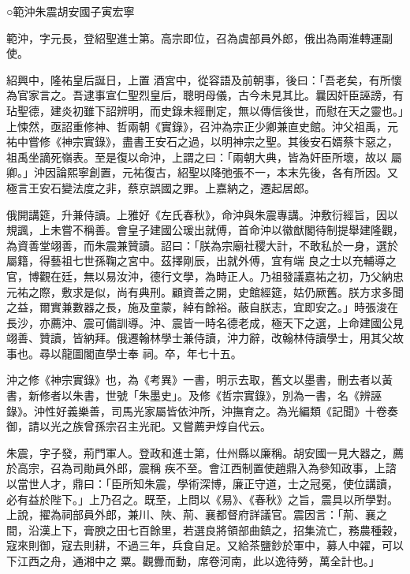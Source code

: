 
\begin{pinyinscope}

 ○範沖朱震胡安國子寅宏寧



 範沖，字元長，登紹聖進士第。高宗即位，召為虞部員外郎，俄出為兩淮轉運副使。



 紹興中，隆祐皇后誕日，上置
 酒宮中，從容語及前朝事，後曰：「吾老矣，有所懷為官家言之。吾逮事宣仁聖烈皇后，聰明母儀，古今未見其比。曩因奸臣誣謗，有玷聖德，建炎初雖下詔辨明，而史錄未經刪定，無以傳信後世，而慰在天之靈也。」上悚然，亟詔重修神、哲兩朝《實錄》，召沖為宗正少卿兼直史館。沖父祖禹，元祐中嘗修《神宗實錄》，盡書王安石之過，以明神宗之聖。其後安石婿蔡卞惡之，祖禹坐謫死嶺表。至是復以命沖，上謂之曰：「兩朝大典，皆為奸臣所壞，故以
 屬卿。」沖因論熙寧創置，元祐復古，紹聖以降弛張不一，本末先後，各有所因。又極言王安石變法度之非，蔡京誤國之罪。上嘉納之，遷起居郎。



 俄開講筵，升兼侍讀。上雅好《左氏春秋》，命沖與朱震專講。沖敷衍經旨，因以規諷，上未嘗不稱善。會皇子建國公瑗出就傅，首命沖以徽猷閣待制提舉建隆觀，為資善堂翊善，而朱震兼贊讀。詔曰：「朕為宗廟社稷大計，不敢私於一身，選於屬籍，得藝祖七世孫鞠之宮中。茲擇剛辰，出就外傅，宜有端
 良之士以充輔導之官，博觀在廷，無以易汝沖，德行文學，為時正人。乃祖發議嘉祐之初，乃父納忠元祐之際，敷求是似，尚有典刑。顧資善之開，史館經筵，姑仍厥舊。朕方求多聞之益，爾實兼數器之長，施及童蒙，綽有餘裕。蔽自朕志，宜即安之。」時張浚在長沙，亦薦沖、震可備訓導。沖、震皆一時名德老成，極天下之選，上命建國公見翊善、贊讀，皆納拜。俄遷翰林學士兼侍讀，沖力辭，改翰林侍讀學士，用其父故事也。尋以龍圖閣直學士奉
 祠。卒，年七十五。



 沖之修《神宗實錄》也，為《考異》一書，明示去取，舊文以墨書，刪去者以黃書，新修者以朱書，世號「朱墨史」。及修《哲宗實錄》，別為一書，名《辨誣錄》。沖性好義樂善，司馬光家屬皆依沖所，沖撫育之。為光編類《記聞》十卷奏御，請以光之族曾孫宗召主光祀。又嘗薦尹焞自代云。



 朱震，字子發，荊門軍人。登政和進士第，仕州縣以廉稱。胡安國一見大器之，薦於高宗，召為司勛員外郎，震稱
 疾不至。會江西制置使趙鼎入為參知政事，上諮以當世人才，鼎曰：「臣所知朱震，學術深博，廉正守道，士之冠冕，使位講讀，必有益於陛下。」上乃召之。既至，上問以《易》、《春秋》之旨，震具以所學對。上說，擢為祠部員外郎，兼川、陜、荊、襄都督府詳議官。震因言：「荊、襄之間，沿漢上下，膏腴之田七百餘里，若選良將領部曲鎮之，招集流亡，務農種穀，寇來則御，寇去則耕，不過三年，兵食自足。又給茶鹽鈔於軍中，募人中糴，可以下江西之舟，通湘中之
 粟。觀釁而動，席卷河南，此以逸待勞，萬全計也。」




\end{pinyinscope}
